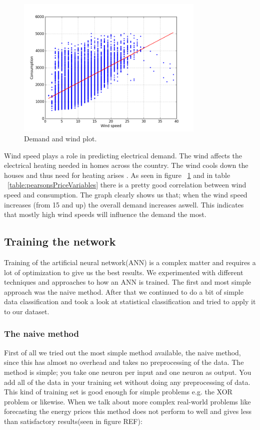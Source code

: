 \begin{figure}[H]
\centering
\includegraphics[width=0.8\textwidth ,natwidth=410,natheight=237]{billeder/energy_price_plots/consump_wind.png}
\caption{Demand and wind plot.}
\label{fig:consump_wind}
\end{figure}

Wind speed plays a role in predicting electrical demand. The wind affects the electrical heating needed in homes across the country. The wind cools down the houses and thus need for heating arises \cite{19}. As seen in figure ~\ref{fig:consump_wind} and in table ~\ref{table:pearsonsPriceVariables} there is a pretty good correlation between wind speed and consumption. The graph clearly shows us that; when the wind speed increases (from 15 and up) the overall demand increases aswell. This indicates that mostly high wind speeds will influence the demand the most.



\subsection{Training the network}
Training of the artificial neural network(ANN) is a complex matter and requires a lot of optimization to give us the best results. We experimented with different techniques and approaches to how an ANN is trained. The first and most simple approach was the naive method. After that we continued to do a bit of simple data classification and took a look at statistical classification and tried to apply it to our dataset.
\subsubsection{The naive method}
First of all we tried out the most simple method available, the naive method, since this has almost no overhead and takes no preprocessing of the data. The method is simple; you take one neuron per input and one neuron as output. You add all of the data in your training set without doing any preprocessing of data. This kind of training set is good enough for simple problems e.g. the XOR problem or likewise. When we talk about more complex real-world problems like forecasting the energy prices this method does not perform to well and gives less than satisfactory results(seen in figure REF):

